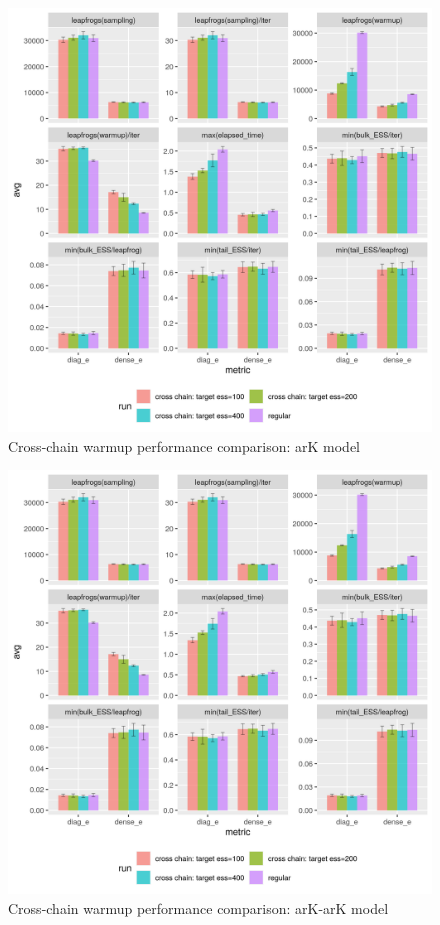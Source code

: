 \documentclass[11pt, reqno, oneside]{amsart}
\begin{document}
\begin{figure}[htbp]
\centering
\includegraphics[width=\textwidth]{./figure/cross_chain_ess_effect_arK.png}
\caption{Cross-chain warmup performance comparison: arK model}
\end{figure}

\begin{figure}[htbp]
\centering
\includegraphics[width=\textwidth]{./figure/cross_chain_ess_effect_arK-arK.png}
\caption{Cross-chain warmup performance comparison: arK-arK model}
\end{figure}
\end{document}
